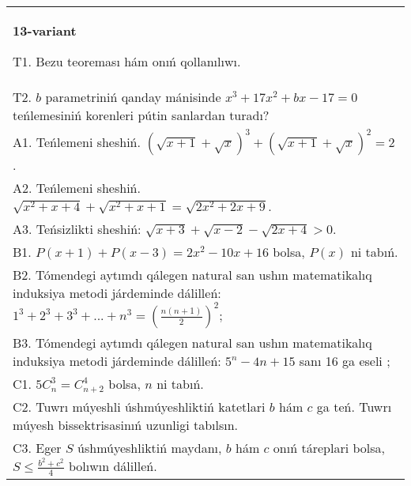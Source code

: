 \documentclass{article}
\begin{document}
\begin{tabular}{m{17cm}}
\textbf{13-variant}
\newline

T1. Bezu teoreması hám onıń qollanılıwı. \\
T2. \(b\) parametriniń qanday mánisinde \(x^{3} + 17x^{2} + bx - 17 = 0\) teńlemesiniń korenleri pútin sanlardan turadı? \\
A1. Teńlemeni sheshiń. \((\sqrt{x + 1} + \sqrt{x})^{3} + (\sqrt{x + 1} + \sqrt{x})^{2} = 2\). \\
A2. Teńlemeni sheshiń. \(\sqrt{x^{2} + x + 4} + \sqrt{x^{2} + x + 1} = \sqrt{2x^{2} + 2x + 9}\). \\
A3. Teńsizlikti sheshiń: \(\sqrt{x + 3} + \sqrt{x - 2} - \sqrt{2x + 4} > 0\). \\
B1. \(P(x + 1) + P(x - 3) = 2x^{2} - 10x + 16\) bolsa, \(P(x)\) ni tabıń. \\
B2. Tómendegi aytımdı qálegen natural san ushın matematikalıq induksiya metodi járdeminde dálilleń: \(1^{3} + 2^{3} + 3^{3} + ... + n^{3} = \left( \frac{n(n + 1)}{2} \right)^{2}\); \\
B3. Tómendegi aytımdı qálegen natural san ushın matematikalıq induksiya metodi járdeminde dálilleń: \(5^{n} - 4n + 15\) sanı 16 ga eseli ; \\
C1. \(5C_{n}^{3} = C_{n + 2}^{4}\) bolsa, \(n\) ni tabıń. \\
C2. Tuwrı múyeshli úshmúyeshliktiń katetlari \(b\) hám \(c\) ga teń. Tuwrı múyesh bissektrisasinıń uzunligi tabılsın. \\
C3. Eger \(S\) úshmúyeshliktiń maydanı, \(b\) hám \(c\) onıń táreplari bolsa, \(S \leq \frac{b^{2} + c^{2}}{4}\) bolıwın dálilleń. \\

\end{tabular}
\vspace{1cm}
\end{document}
